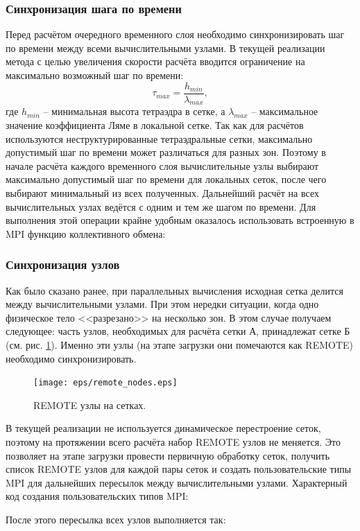 \subsubsection{Синхронизация шага по времени}
Перед расчётом очередного временного слоя необходимо синхронизировать шаг по времени между всеми вычислительными узлами. В текущей реализации метода с целью увеличения скорости расчёта вводится ограничение на максимально возможный шаг по времени:
\begin{equation}
\label{max_time_step}
\tau_{max}=\frac{h_{min}}{\lambda_{max}},
\end{equation}
где $h_{min}$ -- минимальная высота тетраэдра в сетке, а $\lambda_{max}$ --
максимальное значение коэффициента Ляме в локальной сетке. Так как для расчётов
используются неструктурированные тетраэдральные сетки, максимально допустимый
шаг по времени может различаться для разных зон. Поэтому в начале расчёта
каждого временного слоя вычислительные узлы выбирают максимально допустимый шаг
по времени для локальных сеток, после чего выбирают минимальный из всех
полученных. Дальнейший расчёт на всех вычислительных узлах ведётся с одним и тем
же шагом по времени. Для выполнения этой операции крайне удобным оказалось
использовать встроенную в MPI функцию коллективного
обмена:
\subsubsection{Синхронизация узлов}
Как было сказано ранее, при параллельных вычисления исходная сетка делится между вычислительными узлами. При этом нередки ситуации, когда одно физическое тело <<разрезано>> на несколько зон. В этом случае получаем следующее: часть узлов, необходимых для расчёта сетки А, принадлежат сетке Б (см. рис. \ref{pic:remote_nodes}). Именно эти узлы (на этапе загрузки они помечаются как REMOTE) необходимо синхронизировать.
\begin{figure}[htp]
\centering
\texttt{[image: eps/remote\_nodes.eps]}
\caption{REMOTE узлы на сетках.}
\label{pic:remote_nodes}
\end{figure}
В текущей реализации не используется динамическое перестроение сеток, поэтому на протяжении всего расчёта набор REMOTE узлов не меняется. Это позволяет на этапе загрузки провести первичную обработку сеток, получить список REMOTE узлов для каждой пары сеток и создать пользовательские типы MPI для дальнейших пересылок между вычислительными узлами. Характерный код создания пользовательских типов MPI:

После этого пересылка всех узлов выполняется так:

